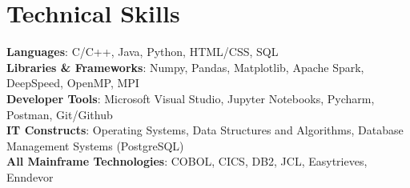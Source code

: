 \documentclass[a4paper,11pt]{article}
\begin{document}

\section{Technical Skills}
 \begin{itemize}[leftmargin=0.15in, label={}]
    \small{\item{
     \textbf{Languages}{: C/C++, Java, Python, HTML/CSS, SQL} \\
     \textbf{Libraries \& Frameworks}{: Numpy, Pandas, Matplotlib, Apache Spark, DeepSpeed, OpenMP, MPI} \\
     \textbf{Developer Tools}{: Microsoft Visual Studio, Jupyter Notebooks, Pycharm, Postman, Git/Github} \\
     \textbf{IT Constructs}{: Operating Systems, Data Structures and Algorithms, Database Management Systems (PostgreSQL)}\\
     \textbf{All Mainframe Technologies}{: COBOL, CICS, DB2, JCL, Easytrieves, Enndevor}
    }}
 \end{itemize}
\end{document}

